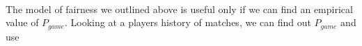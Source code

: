 \documentclass[12pt]{article}
\begin{document}
\paragraph{} The model of fairness we outlined above is useful only if we can find an empirical value of $P_{game}$. Looking at a players history of matches, we can find out $P_{game}$ and use 

\end{document}
